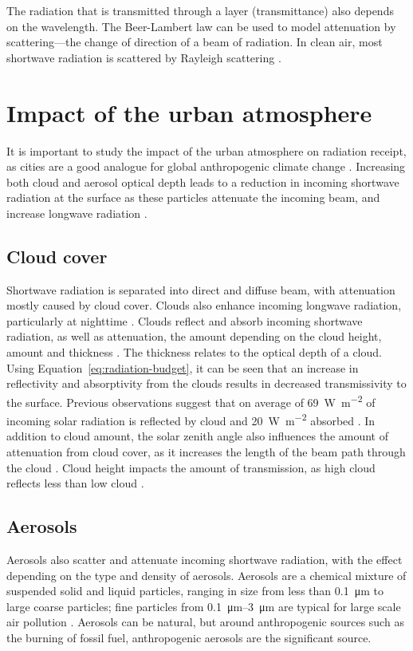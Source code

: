 \documentclass[a4paper,titlepage, twoside]{report}
\begin{document}
The radiation that is transmitted through a layer (transmittance) also depends on the wavelength. The Beer-Lambert law can be used to model attenuation by scattering---the change of direction of a beam of radiation. In clean air, most shortwave radiation is scattered by Rayleigh scattering \parencite{chameides}.

\section{Impact of the urban atmosphere}
It is important to study the impact of the urban atmosphere on radiation receipt, as cities are a good analogue for global anthropogenic climate change \parencite{cleugh}.  Increasing both cloud and aerosol optical depth leads to a reduction in incoming shortwave radiation at the surface as these particles attenuate the incoming beam, and increase longwave radiation \parencite{ipcc}.

\subsection{Cloud cover}
Shortwave radiation is separated into direct and diffuse beam, with attenuation mostly caused by cloud cover. Clouds also enhance incoming longwave radiation, particularly at nighttime \parencite{kotthaus}.  Clouds reflect and absorb incoming shortwave radiation, as well as attenuation, the amount depending on the cloud height, amount and thickness \parencite{iqbal}.  The thickness relates to the optical depth of a cloud. Using Equation~\ref{eq:radiation-budget}, it can be seen that an increase in reflectivity and absorptivity from the clouds results in decreased transmissivity to the surface. Previous observations suggest that on average of \SI{69}{\watt\per\meter\squared} of incoming solar radiation is reflected by cloud and \SI{20}{\watt\per\meter\squared} absorbed \parencite{salby}.  In addition to cloud amount, the solar zenith angle also influences the amount of attenuation from cloud cover, as it increases the length of the beam path through the cloud \parencite{oke}.  Cloud height impacts the amount of transmission, as high cloud reflects less than low cloud \parencite{liou}.

\subsection{Aerosols}
Aerosols also scatter and attenuate incoming shortwave radiation, with the effect depending on the type and density of aerosols. Aerosols are a chemical mixture of suspended solid and liquid particles, ranging in size from less than \SI{0.1}{\micro\meter} to large coarse particles; fine particles from \SIrange{0.1}{3}{\micro\meter} are typical for large scale air pollution \parencite{chameides}.  Aerosols can be natural, but around anthropogenic sources such as the burning of fossil fuel, anthropogenic aerosols are the significant source. 
\end{document}
